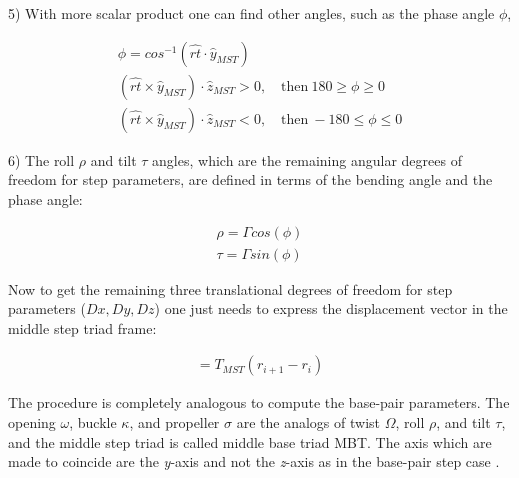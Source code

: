 5) With more scalar product one  can find other angles, such as the phase
angle $\phi$,

\begin{gather}
\phi = cos^{-1}(\hat{rt} \cdot \hat{y}_{MST})\\
(\hat{rt} \times \hat{y}_{MST}) \cdot \hat{z}_{MST} > 0, \quad \textrm{then} \ 180 \geq \phi \geq 0\\
(\hat{rt} \times \hat{y}_{MST}) \cdot \hat{z}_{MST} < 0, \quad \textrm{then} \ -180 \leq \phi \leq 0
\end{gather}

6) The  roll $\rho$  and tilt $\tau$  angles, which are  the remaining
angular degrees of  freedom for step parameters, are  defined in terms
of the bending angle and the phase angle:

\begin{gather}
\rho = \Gamma cos (\phi)\\
\tau = \Gamma sin (\phi)
\end{gather}

Now to  get the remaining  three translational degrees of  freedom for
step  parameters  ($Dx,  Dy,  Dz$)  one  just  needs  to  express  the
displacement vector in the middle step triad frame:

\begin{gather}
[D_xD_yD_z]=T_{MST}(r_{i+1} - r_{i})
\end{gather}

The  procedure  is  completely  analogous  to  compute  the  base-pair
parameters.   The  opening $\omega$,  buckle  $\kappa$, and  propeller
$\sigma$  are the  analogs of  twist $\Omega$,  roll $\rho$,  and tilt
$\tau$, and  the middle  step triad is  called middle base  triad MBT.
The axis  which are made to  coincide are the  \textit{y}-axis and not
the \textit{z}-axis as in the base-pair step case \cite{lu1997}.


